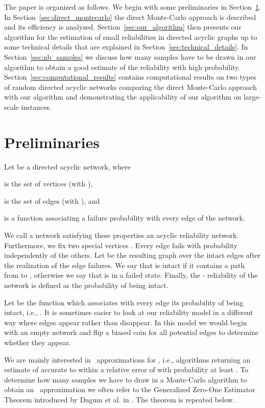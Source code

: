 \documentclass{article}
\begin{document}
The paper is organized as follows. We begin with some
preliminaries in Section~\ref{sec:preliminaries}.
In Section~\ref{sec:direct_montecarlo} the
direct \mbox{Monte-Carlo} approach is described and
its efficiency is analyzed. Section~\ref{sec:our_algorithm}
then presents our algorithm for the estimation of small
reliabilities in directed acyclic graphs up to some technical details that
are explained in Section~\ref{sec:technical_details}. In
Section~\ref{sec:nb_samples} we discuss how many samples have
to be drawn in our algorithm to obtain a good estimate of
the reliability with high probability.
Section~\ref{sec:computational_results} contains
computational results on two types of random directed acyclic networks
comparing the direct \mbox{Monte-Carlo}
approach with our algorithm and demonstrating the applicability
of our algorithm on \mbox{large-scale} instances.

\section{Preliminaries}\label{sec:preliminaries}

Let  be a directed acyclic network, where
\begin{compactitem}
\item  is the set of vertices (with ),
\item  is the set of edges (with ), and
\item  is a function associating
  a failure probability with every edge of the network.
\end{compactitem}

We call a network  satisfying these properties an acyclic
reliability network.
Furthermore, we fix two special vertices . Every
edge  fails with probability
 independently of the others. Let  be the
resulting graph over the intact edges after the realization of the edge failures.
We say that  is
intact if it contains a path from  to ,
otherwise we say that  is in a failed state.
Finally, the - reliability   of the
network  is defined as the probability of  being
intact.

Let  be the function which
associates with every edge its probability of being intact,
i.e., . It is sometimes easier
to look at our reliability model in a different way where edges
appear rather than disappear. In this model we would begin
with an empty network and flip a biased coin for all
potential edges  to determine whether they appear.

We are mainly interested in ~approximations
for , i.e., algorithms
returning an estimate of  accurate to
within a relative error of  with probability
at least .
To determine how many samples we have to draw in a
\mbox{Monte-Carlo} algorithm to obtain an ~approximation
we often refer to the Generalized \mbox{Zero-One} Estimator Theorem
introduced by Dagum et al. in \cite{dagum_2000_optimal}. The theorem is repeated
below.
\end{document}
